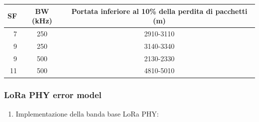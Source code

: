 \documentclass[a4paper]{report} %
\begin{document}
\begin{center}
\begin{tabular}{r|c|c|}
SF&BW (kHz)&Portata inferiore al 10\% della perdita di pacchetti (m)\\ \hline
7&250&2910-3110\\ \hline
9&250&3140-3340\\ \hline
9&500&2130-2330\\ \hline
11&500&4810-5010\\ \hline
\end{tabular}
\end{center}

\subsubsection{LoRa PHY error model}
\begin{enumerate}
\item Implementazione della banda base LoRa PHY: 

\end{enumerate}
\end{document}
